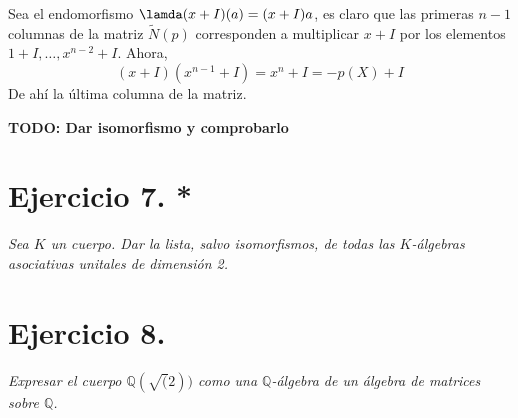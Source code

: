 \documentclass[UTF8]{article}
\begin{document}
Sea el endomorfismo \(\lamda(x+I)(a) = (x+I)a\), es claro que las primeras
\(n-1\) columnas de la matriz \(\tilde{N}(p)\) corresponden a multiplicar \(x +
I\) por los elementos \(1 + I, \dots, x^{n-2} + I\). Ahora,
\[
(x + I)(x^{n-1} + I) = x^n + I = -p(X) + I
\]
De ahí la última columna de la matriz.

\textbf{TODO: Dar isomorfismo y comprobarlo}

\section{Ejercicio 7. *} \emph{Sea \(K\) un cuerpo. Dar la lista, salvo isomorfismos, de
todas las \(K\)-álgebras asociativas unitales de dimensión 2.}\\

\section{Ejercicio 8.} \emph{Expresar el cuerpo \(\mathbb{Q}(\sqrt(2))\) como una
\(\mathbb{Q}\)-álgebra de un álgebra de matrices sobre \(\mathbb{Q}\).}
\end{document}
